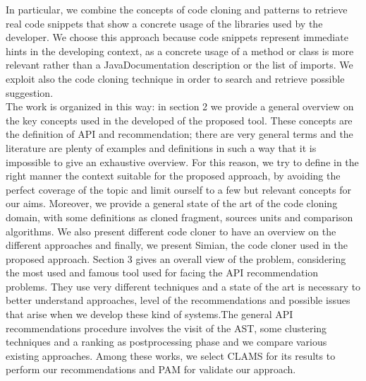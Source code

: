 	
In particular, we combine the concepts of code cloning and patterns to retrieve real code snippets that show a concrete usage of the libraries used by the developer. We choose this approach because code snippets represent immediate hints in the developing context, as a concrete usage of a method or class is more relevant rather than a JavaDocumentation description or the list of imports. We exploit also the code cloning technique in order to search and retrieve possible suggestion.\\
The work is organized in this way: in section 2 we provide a general overview on the key concepts used in the developed of the proposed tool. These concepts are the definition of API and recommendation; there are very general terms and the literature are plenty of examples and definitions in such a way that it is impossible to give an exhaustive overview. For this reason, we try to define in the right manner the context suitable for the proposed approach, by avoiding the perfect coverage of the topic and limit ourself to a few but relevant concepts for our aims. Moreover, we provide a general state of the art of the code cloning domain, with some definitions as cloned fragment, sources units and comparison algorithms. We also present different code cloner to have an overview on the different approaches and finally, we present Simian, the code cloner used in the proposed approach.
Section 3 gives an overall view of the problem, considering the most used and famous tool used for facing the API recommendation problems. They use very different techniques and a state of the art is necessary to better understand approaches, level of the recommendations and possible issues that arise when we develop these kind of systems.The general API recommendations procedure involves the visit of the AST, some clustering techniques and a ranking as postprocessing phase and we compare various existing approaches. Among these works, we select CLAMS for its results to perform our recommendations and PAM  for validate our approach. \\
